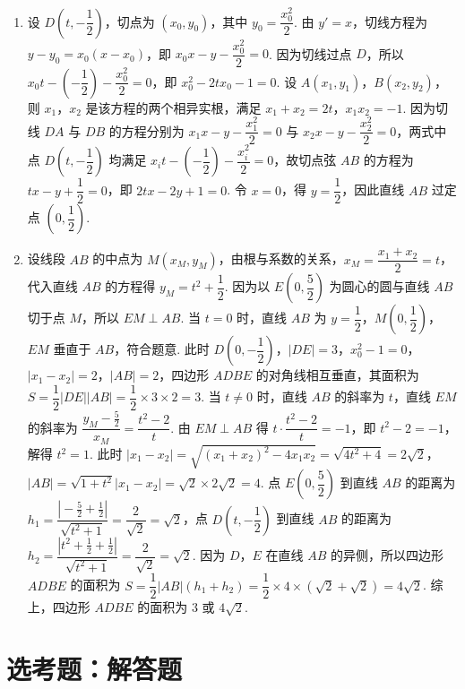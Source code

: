 \begin{solution}
\begin{enumerate}
\item 设 \(D\left(t,-\dfrac12\right)\)，切点为 \((x_0,y_0)\)，其中 \(y_0=\dfrac{x_0^2}{2}\). 由 \(y'=x\)，切线方程为 \(y-y_0=x_0(x-x_0)\)，即 \(x_0x-y-\dfrac{x_0^2}{2}=0\).
因为切线过点 \(D\)，所以 \(x_0t-\left(-\dfrac12\right)-\dfrac{x_0^2}{2}=0\)，即 \(x_0^2-2tx_0-1=0\).
设 \(A(x_1,y_1)\)，\(B(x_2,y_2)\)，则 \(x_1\)，\(x_2\) 是该方程的两个相异实根，满足 \(x_1+x_2=2t\)，\(x_1x_2=-1\).
因为切线 \(DA\) 与 \(DB\) 的方程分别为 \(x_1x-y-\dfrac{x_1^2}{2}=0\) 与 \(x_2x-y-\dfrac{x_2^2}{2}=0\)，两式中点 \(D\left(t,-\dfrac12\right)\) 均满足 \(x_it-\left(-\dfrac12\right)-\dfrac{x_i^2}{2}=0\)，故切点弦 \(AB\) 的方程为 \(tx-y+\dfrac12=0\)，即 \(2tx-2y+1=0\). 令 \(x=0\)，得 \(y=\dfrac12\)，因此直线 \(AB\) 过定点 \(\left(0,\dfrac12\right)\).

\item 设线段 \(AB\) 的中点为 \(M(x_M,y_M)\)，由根与系数的关系，\(x_M=\dfrac{x_1+x_2}{2}=t\)，代入直线 \(AB\) 的方程得 \(y_M=t^2+\dfrac12\).
因为以 \(E\left(0,\dfrac52\right)\) 为圆心的圆与直线 \(AB\) 切于点 \(M\)，所以 \(EM\perp AB\).
当 \(t=0\) 时，直线 \(AB\) 为 \(y=\dfrac12\)，\(M\left(0,\dfrac12\right)\)，\(EM\) 垂直于 \(AB\)，符合题意. 此时 \(D\left(0,-\dfrac12\right)\)，\(|DE|=3\)，\(x_0^2-1=0\)，\(|x_1-x_2|=2\)，\(|AB|=2\)，四边形 \(ADBE\) 的对角线相互垂直，其面积为 \(S=\dfrac12|DE||AB|=\dfrac12\times3\times2=3\).
当 \(t\ne0\) 时，直线 \(AB\) 的斜率为 \(t\)，直线 \(EM\) 的斜率为 \(\dfrac{y_M-\frac52}{x_M}=\dfrac{t^2-2}{t}\). 由 \(EM\perp AB\) 得 \(t\cdot\dfrac{t^2-2}{t}=-1\)，即 \(t^2-2=-1\)，解得 \(t^2=1\). 此时 \(|x_1-x_2|=\sqrt{(x_1+x_2)^2-4x_1x_2}=\sqrt{4t^2+4}=2\sqrt2\)，\(|AB|=\sqrt{1+t^2}|x_1-x_2|=\sqrt2\times2\sqrt2=4\).
点 \(E\left(0,\dfrac52\right)\) 到直线 \(AB\) 的距离为 \(h_1=\dfrac{|\!-\frac52+\frac12|}{\sqrt{t^2+1}}=\dfrac{2}{\sqrt2}=\sqrt2\)，点 \(D\left(t,-\dfrac12\right)\) 到直线 \(AB\) 的距离为 \(h_2=\dfrac{|t^2+\frac12+\frac12|}{\sqrt{t^2+1}}=\dfrac{2}{\sqrt2}=\sqrt2\).
因为 \(D\)，\(E\) 在直线 \(AB\) 的异侧，所以四边形 \(ADBE\) 的面积为 \(S=\dfrac12|AB|(h_1+h_2)=\dfrac12\times4\times(\sqrt2+\sqrt2)=4\sqrt2\).
综上，四边形 \(ADBE\) 的面积为 \(3\) 或 \(4\sqrt2\).
\end{enumerate}
\end{solution}

\section{选考题：解答题}

